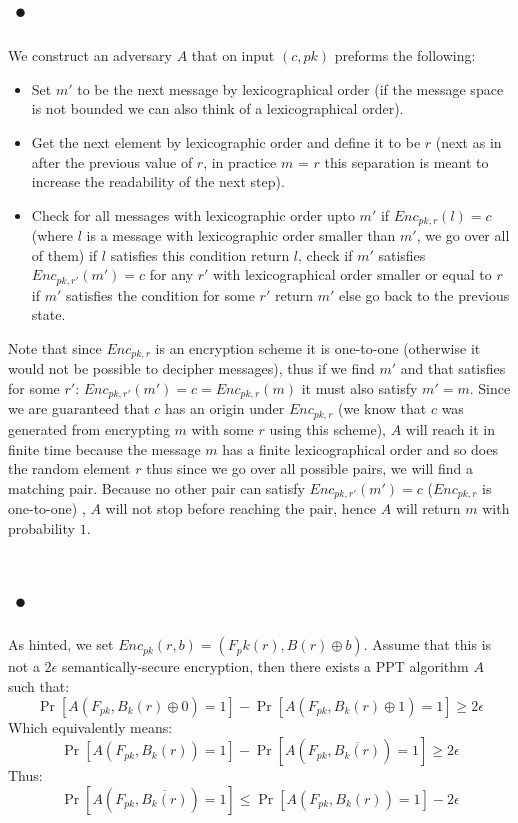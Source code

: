 \documentclass{article}
\begin{document}
\section{•}
We construct an adversary $A$ that on input $(c, pk)$ preforms the following:
\begin{itemize}
\item Set $m'$ to be the next message by lexicographical order (if the message space is not bounded we can also think of a lexicographical order).
\item Get the next element by lexicographic order and define it to be $r$ (next as in after the previous value of $r$, in practice $m$ = $r$ this separation is meant to increase the readability of the next step).
\item Check for all messages with lexicographic order upto $m'$ if $Enc_{pk, r}(l) = c$ (where $l$ is a message with lexicographic order smaller than $m'$, we go over all of them) if $l$ satisfies this condition return  $l$, check if $m'$ satisfies   $Enc_{pk, r'}(m') = c$ for any $r'$ with lexicographical order smaller or equal to $r$ if $m'$ satisfies the condition for some $r'$ return $m'$ else go back to the previous state.
\end{itemize}

Note that since $Enc_{pk,r}$ is an encryption scheme it is one-to-one (otherwise it would not be possible to decipher messages), thus if we find $m'$  and that satisfies for some $r'$: $Enc_{pk,r'}(m') = c = Enc_{pk,r}(m)$ it must also satisfy  $m' =m$. Since we are guaranteed that $c$ has an origin under $Enc_{pk, r}$ (we know that $c$ was generated from encrypting $m$ with some $r$ using this scheme), $A$ will reach it in finite time because the message $m$ has a finite lexicographical order and so does the random element $r$ thus since we go over all possible pairs, we will find a matching pair. Because no other pair can satisfy  $Enc_{pk, r'}(m') = c$  ($Enc_{pk, r}$ is one-to-one) , $A$ will not stop before reaching the pair, hence $A$ will return $m$ with probability $1$.

\section{•}
As hinted, we set $Enc_{pk}(r, b) = (F_pk(r) , B(r) \oplus b)$.
Assume that this is not a $2\epsilon$ semantically-secure encryption, then there exists a PPT algorithm $A$ such that:
\[\Pr[A(F_{pk}, B_k(r)\oplus 0) = 1] -  \Pr[A(F_{pk}, B_k(r)\oplus 1) = 1] \geq 2\epsilon \]
Which equivalently means:
\[\Pr[A(F_{pk}, B_k(r)) = 1] -  \Pr[A(F_{pk}, \overline{B_k(r)}) = 1] \geq  2\epsilon \]
Thus:
\[\Pr[A(F_{pk}, \overline{B_k(r)}) = 1] \leq \Pr[A(F_{pk}, B_k(r)) = 1] - 2\epsilon \]
\end{document}
